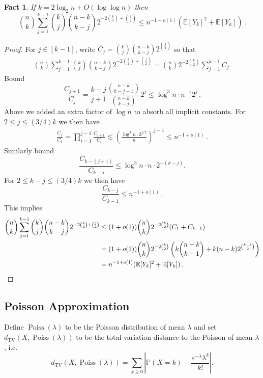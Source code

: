 \documentclass[11pt]{article}
\newtheorem{fact}[theorem]{Fact}
\theoremstyle{definition}
\theoremstyle{remark}
\newcommand{\Poiss}{\operatorname{Poiss}}
\newcommand{\TV}{\mathrm{TV}}
\newcommand{\E}{\mathbb{E}}
\newcommand{\PP}{\mathbb{P}}
\begin{document}
\begin{fact}\label{fact:Y-k-Delta}
    If $k = 2\log_2 n + O(\log \log n)$ then $$\binom{n}{k}\sum_{j = 1}^{k-1} \binom{k}{j}\binom{n-k}{k-j}2^{-2\binom{k}{2}+ \binom{j}{2}} \leq n^{-1 + o(1)}( \E [Y_k]^2 + \E [Y_k]) \,. $$
\end{fact}
\begin{proof}
   For $j \in [k-1]$, write $C_j= {\binom{k}{j}}{\binom{n-k}{k-j}} 2^{\binom{j}{2}}$ so that \begin{align*}
        \binom{n}{k}\sum_{j = 1}^{k-1} \binom{k}{j}\binom{n-k}{k-j}2^{-2\binom{k}{2}+ \binom{j}{2}} = \binom{n}{k} 2^{-2\binom{k}{2}} \sum_{j = 1}^{k-1} C_j.
    \end{align*}
%
    Bound  \begin{equation*}
        \frac{C_{j+1}}{C_j} = \frac{k-j}{j+1} \frac{\binom{n-k}{k-j-1}}{\binom{n-k}{k-j}} 2^j \leq \log^3 n \cdot n^{-1} 2^{j}\,.
    \end{equation*}
   Above we added an extra factor of $\log n$ to absorb all implicit constants.  For $2 \leq j \leq (3/4)k$ we then have 
   \begin{align*}
        \frac{C_j}{C_1} = \prod_{i = 1}^{j-1} \frac{C_{i+1}}{C_i} \lesssim \left(\frac{\log^3 n \cdot 2^{j/2}}{n}\right)^{j-1} \leq n^{-1 + o(1)}\,.
    \end{align*}
    Similarly bound \begin{equation*}
        \frac{C_{k-(j+1)}}{C_{k - j}} \leq \log^3 n \cdot n \cdot 2^{-(k-j)}.
    \end{equation*}
    For $2 \leq k - j \leq (3/4)k$ we then have $$\frac{C_{k - j}}{C_{k-1}} \leq n^{-1 + o(1)}\,.$$
%
    This implies \begin{align*} \binom{n}{k}\sum_{j = 1}^{k-1} \binom{k}{j}\binom{n-k}{k-j}2^{-2\binom{k}{2}+ \binom{j}{2}} &\leq (1 + o(1))\binom{n}{k} 2^{-2\binom{k}{2}}(C_1 + C_{k-1}) \\
    &= (1 + o(1))\binom{n}{k} 2^{-2\binom{k}{2}}\left(k{n-k \choose k-1} + k(n-k)2^{{k-1 \choose 2}}\right) \\ 
    &= n^{-1 + o(1)}( \E [Y_k]^2 + \E [Y_k])\,. \qedhere
    \end{align*}
\end{proof}

\subsection{Poisson Approximation}

Define $\Poiss(\lambda)$ to be the Poisson distribution of mean $\lambda$ and set $d_{\TV}(X,\Poiss(\lambda))$ to be the total variation distance to the Poisson of mean $\lambda$, i.e.\ $$d_{\TV}(X,\Poiss(\lambda)) = \sum_{k \geq 0}\left|\PP(X = k) - \frac{e^{-\lambda} \lambda^k}{k!} \right|.$$
   
\end{document}
